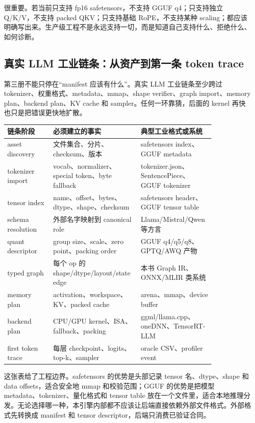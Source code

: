  很重要。若当前只支持 fp16 safetensors，不支持 GGUF q4；只支持独立 Q/K/V，不支持 packed QKV；只支持基础 RoPE，不支持某种 scaling；都应该明确写出来。生产级工程不是永远支持一切，而是知道自己支持什么、拒绝什么、如何诊断。

\subsection{真实 LLM 工业链条：从资产到第一条 token trace}

第三册不能只停在“manifest 应该有什么”。真实 LLM 工业链条至少跨过 tokenizer、权重格式、metadata、mmap、shape verifier、graph import、memory plan、backend plan、KV cache 和 sampler。任何一环靠猜，后面的 kernel 再快也只是把错误更快地扩散。

\begin{center}
\small
\begin{tabular}{p{0.21\linewidth}p{0.33\linewidth}p{0.30\linewidth}}
\toprule
链条阶段 & 必须建立的事实 & 典型工业格式或系统 \\
\midrule
asset discovery & 文件集合、分片、checksum、版本 & safetensors index、GGUF metadata \\
tokenizer import & vocab、normalizer、special token、byte fallback & tokenizer.json、SentencePiece、GGUF tokenizer \\
tensor index & name、offset、bytes、dtype、shape、checksum & safetensors header、GGUF tensor table \\
schema resolution & 外部名字映射到 canonical role & Llama/Mistral/Qwen 等方言 \\
quant descriptor & group size、scale、zero point、packing order & GGUF q4/q5/q8、GPTQ/AWQ 产物 \\
typed graph & 每个 op 的 shape/dtype/layout/state edge & 本书 Graph IR、ONNX/MLIR 类系统 \\
memory plan & activation、workspace、KV、packed cache & arena、mmap、device buffer \\
backend plan & CPU/GPU kernel、ISA、fallback、packing & ggml/llama.cpp、oneDNN、TensorRT-LLM \\
first token trace & 每层 checkpoint、logits、top-k、sampler & oracle CSV、profiler event \\
\bottomrule
\end{tabular}
\end{center}

这张表给了工程边界。safetensors 的优势是头部记录 tensor 名、dtype、shape 和 data offsets，适合安全地 mmap 和校验范围；GGUF 的优势是把模型 metadata、tokenizer、量化格式和 tensor table 放在一个文件里，适合本地推理分发。无论选择哪一种，本引擎内部都不应该让后端直接依赖外部文件格式。外部格式先转换成 manifest 和 tensor descriptor，后端只消费已验证合同。

